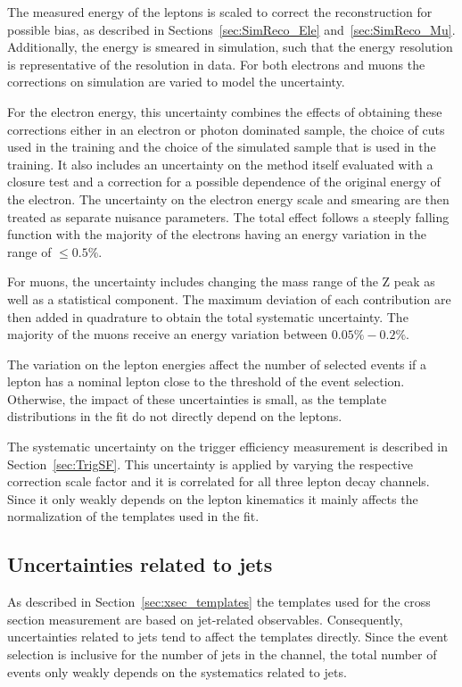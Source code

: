 The measured energy of the leptons is scaled to correct the reconstruction for possible bias, as described in Sections~\ref{sec:SimReco_Ele} and~\ref{sec:SimReco_Mu}. Additionally, the energy is smeared in simulation, such that the energy resolution is representative of the resolution in data.
For both electrons and muons the corrections on simulation are varied to model the uncertainty.

For the electron energy, this uncertainty combines the effects of obtaining these corrections either in an electron or photon dominated sample, the choice of cuts used in the training and the choice of the simulated sample that is used in the training. It also includes an uncertainty on the method itself evaluated with a closure test and a correction for a possible
dependence of the original energy of the electron.
The uncertainty on the electron energy scale and smearing are then treated as separate nuisance parameters.
The total effect follows a steeply falling function with the majority of the electrons having an energy variation in the range of $\leq 0.5\%$.

For muons, the uncertainty includes changing the mass range of the Z peak as well as a statistical component. The maximum deviation of each contribution are then added in quadrature to obtain the total systematic uncertainty.
The majority of the muons receive an energy variation between $0.05\% - 0.2\%$.

The variation on the lepton energies affect the number of selected events if a lepton has a nominal lepton \pt close to the threshold of the event selection.
Otherwise, the impact of these uncertainties is small, as the template distributions in the fit do not directly depend on the leptons.

The systematic uncertainty on the trigger efficiency measurement is described in Section~\ref{sec:TrigSF}. This uncertainty is applied by varying the respective correction scale factor
and it is correlated for all three lepton decay channels. Since it only weakly depends on the lepton kinematics it mainly affects the normalization of the templates used in the fit.

\subsection{Uncertainties related to jets}

As described in Section~\ref{sec:xsec_templates} the templates used for the cross section measurement are based on jet-related observables.
Consequently, uncertainties related to jets tend to affect the templates directly. 
Since the event selection is inclusive for the number of jets in the \emu channel, the total number of events only weakly depends on the systematics related to jets.

